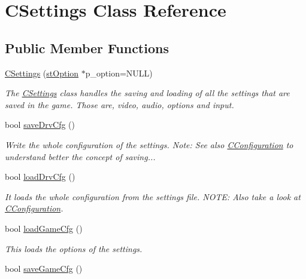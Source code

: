 \hypertarget{class_c_settings}{
\section{CSettings Class Reference}
\label{class_c_settings}
}
\subsection*{Public Member Functions}
\begin{DoxyCompactItemize}
\item 
\hyperlink{class_c_settings_a5865e8e8e7e1caa507b2fc0c6118f3e3}{CSettings} (\hyperlink{structst_option}{stOption} $\ast$p\_\-option=NULL)
\begin{DoxyCompactList}\small\item\em The \hyperlink{class_c_settings}{CSettings} class handles the saving and loading of all the settings that are saved in the game. Those are, video, audio, options and input. \item\end{DoxyCompactList}\item 
bool \hyperlink{class_c_settings_a1719f6bb6c031a3b55ea67cd394c5b66}{saveDrvCfg} ()
\begin{DoxyCompactList}\small\item\em Write the whole configuration of the settings. Note: See also \hyperlink{class_c_configuration}{CConfiguration} to understand better the concept of saving... \item\end{DoxyCompactList}\item 
bool \hyperlink{class_c_settings_a6430e6cc3f4b46b028a95510d70a510d}{loadDrvCfg} ()
\begin{DoxyCompactList}\small\item\em It loads the whole configuration from the settings file. NOTE: Also take a look at \hyperlink{class_c_configuration}{CConfiguration}. \item\end{DoxyCompactList}\item 
bool \hyperlink{class_c_settings_ab74fc80043caf8db7b36e903d54dd9ae}{loadGameCfg} ()
\begin{DoxyCompactList}\small\item\em This loads the options of the settings. \item\end{DoxyCompactList}\item 
\hypertarget{class_c_settings_aa6ae00594b388c294f0cb235ec5b2f8a}{
bool \hyperlink{class_c_settings_aa6ae00594b388c294f0cb235ec5b2f8a}{saveGameCfg} ()}
\label{class_c_settings_aa6ae00594b388c294f0cb235ec5b2f8a}


\end{DoxyCompactItemize}
